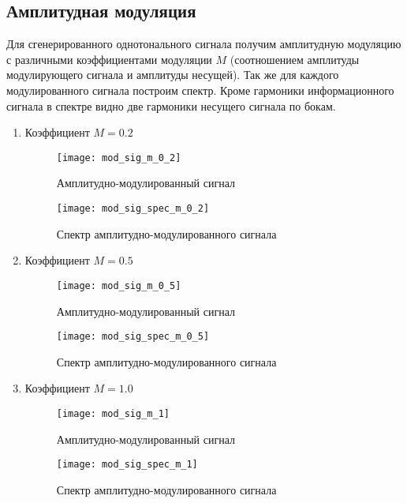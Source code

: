 \subsection{Амплитудная модуляция}
Для сгенерированного однотонального сигнала получим амплитудную модуляцию с различными
коэффициентами модуляции $ M $ (соотношением амплитуды модулирующего сигнала и амплитуды несущей).
Так же для каждого модулированного сигнала построим спектр. 
Кроме гармоники информационного сигнала в спектре видно две гармоники несущего сигнала по бокам.

\begin{enumerate}
\item Коэффициент $ M = 0.2$
\begin{figure}[H]
	\begin{center}
		\texttt{[image: mod\_sig\_m\_0\_2]}
		\caption{Амплитудно-модулированный сигнал } 
		\label{pic:signal_modulated_0_5} %
	\end{center}
\end{figure}

\begin{figure}[H]
	\begin{center}
		\texttt{[image: mod\_sig\_spec\_m\_0\_2]}
		\caption{Спектр амплитудно-модулированного сигнала} 
		\label{pic:mod_sig_spec_0_5} %
	\end{center}
\end{figure}


\item Коэффициент $ M = 0.5$
\begin{figure}[H]
	\begin{center}
		\texttt{[image: mod\_sig\_m\_0\_5]}
		\caption{Амплитудно-модулированный сигнал } 
		\label{pic:signal_modulated_0_2} %
	\end{center}
\end{figure}
\begin{figure}[H]
	\begin{center}
		\texttt{[image: mod\_sig\_spec\_m\_0\_5]}
		\caption{Спектр амплитудно-модулированного сигнала } 
		\label{pic:mod_sig_spec_0_2} %
	\end{center}
\end{figure}

\item Коэффициент $ M = 1.0$
\begin{figure}[H]
	\begin{center}
		\texttt{[image: mod\_sig\_m\_1]}
		\caption{Амплитудно-модулированный сигнал } 
		\label{pic:signal_modulated_1_0} %
	\end{center}
\end{figure}
\begin{figure}[H]
	\begin{center}
		\texttt{[image: mod\_sig\_spec\_m\_1]}
		\caption{Спектр амплитудно-модулированного сигнала } 
		\label{pic:mod_sig_spec_1_0} %
	\end{center}
\end{figure}


\end{enumerate}
